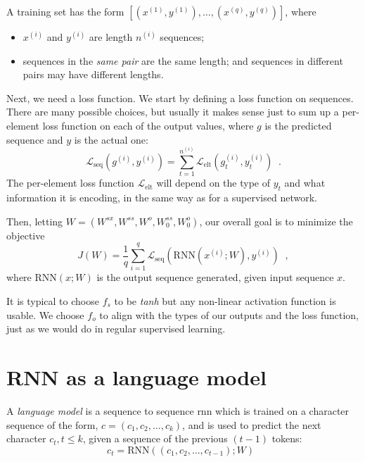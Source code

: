 A training  set has the form 
$\left[\left(x^{(1)}, y^{(1)}\right), \dots, \left(x^{(q)},
    y^{(q)}\right)\right]$, where
\begin{itemize}
\item
$x^{(i)}$ and $y^{(i)}$ are length $n^{(i)}$ sequences; 
\item
sequences in the {\it{same pair}} are the same length; and
sequences in different pairs may have different lengths.
\end{itemize}

Next, we need a loss function.  We start by defining a loss function
on sequences.  There are many possible choices, but usually it makes
sense just to sum up a per-element loss function on each of the output
values, where $g$ is the predicted sequence and $y$ is the actual one: 
\begin{equation}
\mathcal{L}_{\text{seq}}\left(g^{(i)}, y^{(i)}\right) = \sum_{t =
    1}^{n^{(i)}}\mathcal{L}_\text{elt}\left(g_t^{(i)},
    y_t^{(i)}\right) \;\;.
\end{equation} 
The per-element loss function $\mathcal{L}_\text{elt}$ will depend on
the type of $y_t$ 
and what information it is encoding, in the same way as for a
supervised network.

Then, letting $W =\left(W^{sx}, W^{ss}, W^o, W^{ss}_0,
  W_0^o\right)$, our overall goal is to minimize the objective
\begin{equation}
 J(W) = \frac{1}{q} \sum_{i = 1}^q\mathcal{L}_{\text{seq}}\left(
    \text{RNN}(x^{(i)};W), y^{(i)}\right) \;\;,
\end{equation}
where $\text{RNN}(x; W)$ is the output sequence generated, given
input sequence $x$.

It is typical to choose $f_s$ to be {\it tanh}  but any non-linear
activation function is usable.  We choose  $f_o$ to align with the
types of our outputs and the loss function,  just as we would do in
regular supervised learning.


\section{RNN as a language model}
\label{sec:language}

A {\em language model} is a sequence to sequence {\sc rnn} which is
trained on a character sequence of the form, $c = (c_1, c_2,
\ldots, c_k)$, and is used to predict the next character $c_t, t \leq k$,
given a sequence of the previous $(t-1)$ tokens: 
\begin{equation}
c_t = \text{RNN}\left((c_1, c_2, \dots, c_{t - 1}) ; W \right)\;\;
\end{equation} 

